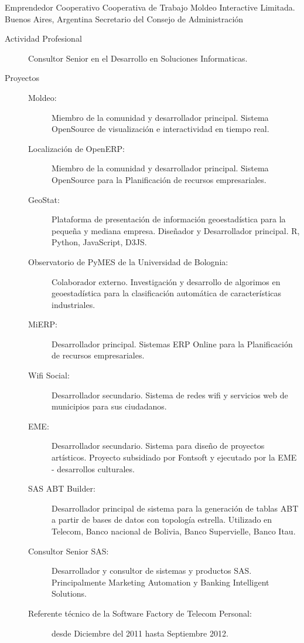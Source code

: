 	{Emprendedor Cooperativo}
	{Cooperativa de Trabajo Moldeo Interactive Limitada.}
	{Buenos Aires, Argentina}
	{Secretario del Consejo de Administración}
	{\begin{description}
	\item [Actividad Profesional] Consultor Senior en el Desarrollo en Soluciones Informaticas.
	\item [Proyectos]
	\begin{description}
		\item [Moldeo:] Miembro de la comunidad y desarrollador principal. Sistema OpenSource de visualización e interactividad en tiempo real.
		\item [Localización de OpenERP:] Miembro de la comunidad y desarrollador principal. Sistema OpenSource para la Planificación de recursos empresariales.
		\item [GeoStat:] Plataforma de presentación de información geoestadística para la pequeña y mediana empresa. Diseñador y Desarrollador principal. R, Python, JavaScript, D3JS.
		\item [Observatorio de PyMES de la Universidad de Bolognia:] Colaborador externo. Investigación y desarrollo de algorimos en geoestadística para la clasificación automática de características industriales.
		\item [MiERP:] Desarrollador principal. Sistemas ERP Online para la Planificación de recursos empresariales.
		\item [Wifi Social:] Desarrollador secundario. Sistema de redes wifi y servicios web de municipios para sus ciudadanos.
		\item [EME:] Desarrollador secundario. Sistema para diseño de proyectos artísticos. Proyecto subsidiado por Fontsoft y ejecutado por la EME - desarrollos culturales.
		\item [SAS ABT Builder:] Desarrollador principal de sistema para la generación de
			tablas ABT a partir de bases de datos con topología estrella. Utilizado
			en Telecom, Banco nacional de Bolivia, Banco Supervielle, Banco Itau.
		\item [Consultor Senior SAS:] Desarrollador y consultor de sistemas y productos SAS. Principalmente Marketing Automation y Banking Intelligent Solutions.
		\item [Referente técnico de la Software Factory de Telecom Personal:] desde Diciembre del 2011 hasta Septiembre 2012.
	\end{description}
	\end{description}}
